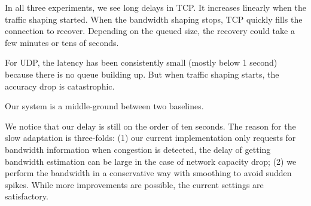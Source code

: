 In all three experiments, we see long delays in TCP. It increases linearly when
the traffic shaping started. When the bandwidth shaping stops, TCP quickly fills
the connection to recover. Depending on the queued size, the recovery could take
a few minutes or tens of seconds.

For UDP, the latency has been consistently small (mostly below 1 second) because
there is no queue building up. But when traffic shaping starts, the accuracy
drop is catastrophic.

Our system is a middle-ground between two baselines.

We notice that our delay is still on the order of ten seconds. The reason for
the slow adaptation is three-folds: (1) our current implementation only requests
for bandwidth information when congestion is detected, the delay of getting
bandwidth estimation can be large in the case of network capacity drop; (2) we
perform the bandwidth in a conservative way with smoothing to avoid sudden
spikes. While more improvements are possible, the current settings are
satisfactory.

